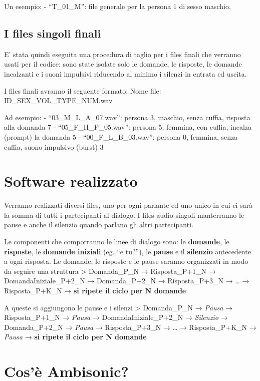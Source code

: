 \documentclass[
]{article}
\begin{document}
Un esempio: - ``T\_01\_M'': file generale per la persona 1 di sesso maschio.

\subsection{I files singoli finali}\label{i-files-singoli-finali}

E' stata quindi eseguita una procedura di taglio per i files finali che verranno usati per il codice: sono state isolate solo le domande, le risposte, le domande incalzanti e i suoni impulsivi riducendo al minimo i silenzi in entrata ed uscita.

I files finali avranno il seguente formato: Nome file: ID\_SEX\_VOL\_TYPE\_NUM.wav

Ad esempio: - ``03\_M\_L\_A\_07.wav'': persona 3, maschio, senza cuffia, risposta alla domanda 7 - ``05\_F\_H\_P\_05.wav'': persona 5, femmina, con cuffia, incalza (prompt) la domanda 5 - ``00\_F\_L\_B\_03.wav'': persona 0, femmina, senza cuffia, suono impulsivo (burst) 3

\section{Software realizzato}\label{software-realizzato}

Verranno realizzati diversi files, uno per ogni parlante ed uno unico in cui ci sarà la somma di tutti i partecipanti al dialogo. I files audio singoli manterranno le pause e anche il silenzio quando parlano gli altri partecipanti.

Le componenti che comporranno le linee di dialogo sono: le \textbf{domande}, le \textbf{risposte}, le \textbf{domande iniziali} (eg. ``e tu?''), le \textbf{pause} e il \textbf{silenzio} antecedente a ogni risposta. Le domande, le risposte e le pause saranno organizzati in modo da seguire una struttura \textgreater{} Domanda\_P\_N → Risposta\_P+1\_N → DomandaIniziale\_P+2\_N → Domanda\_P+2\_N → Risposta\_P+3\_N → \ldots{} → Risposta\_P+K\_N → \textbf{si ripete il ciclo per N domande}

A queste si aggiungono le pause e i silenzi \textgreater{} Domanda\_P\_N → \emph{Pausa} → Risposta\_P+1\_N → \emph{Pausa} → DomandaIniziale\_P+2\_N → \emph{Silenzio} → Domanda\_P+2\_N → \emph{Pausa} → Risposta\_P+3\_N → \ldots{} → Risposta\_P+K\_N → \emph{Pausa} → \textbf{si ripete il ciclo per N domande}

\section{Cos'è Ambisonic?}\label{cosuxe8-ambisonic}
\end{document}

